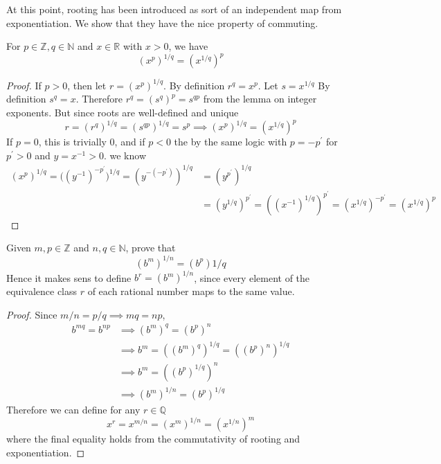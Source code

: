     At this point, rooting has been introduced as sort of an independent map from exponentiation. We show that they have the nice property of commuting. 

    \begin{lemma}
      For $p \in \mathbb{Z}, q \in \mathbb{N}$ and $x \in \mathbb{R}$ with $x > 0$, we have 
      \begin{equation}
        (x^{p})^{1/q} = (x^{1/q})^p
      \end{equation}
    \end{lemma}
    \begin{proof}
      If $p > 0$, then let $r = (x^p)^{1/q}$. By definition $r^q = x^p$. Let $s = x^{1/q}$ By definition $s^q = x$. Therefore $r^q = (s^q)^p = s^{qp}$ from the lemma on integer exponents. But since roots are well-defined and unique 
      \begin{equation}
        r = (r^q)^{1/q} = (s^{qp})^{1/q} = s^p \implies (x^p)^{1/q} = (x^{1/q})^p
      \end{equation}
      If $p = 0$, this is trivially $0$, and if $p < 0$ the by the same logic with $p = -p^\prime$ for $p^\prime > 0$ and $y = x^{-1} > 0$. we know 
      \begin{align}
        (x^p)^{1/q} = \big( (y^{-1})^{-p^\prime} \big)^{1/q} = (y^{-(-p^\prime)})^{1/q} & = (y^{p^\prime})^{1/q} \\ 
                           & = (y^{1/q})^{p^\prime} = ((x^{-1})^{1/q})^{p^\prime} = (x^{1/q})^{-p^\prime} = (x^{1/q})^p
      \end{align}
    \end{proof}

    \begin{theorem}
      Given $m, p \in \mathbb{Z}$ and $n, q \in \mathbb{N}$, prove that 
      \begin{equation}
        (b^m)^{1/n} = (b^p){1/q}
      \end{equation}
      Hence it makes sens to define $b^r = (b^m)^{1/n}$, since every element of the equivalence class $r$ of each rational number maps to the same value. 
    \end{theorem} 
    \begin{proof}
      Since $m/n = p/q \implies mq = np$, 
      \begin{align}
        b^{mq} = b^{np} & \implies (b^m)^q = (b^p)^n \\
                        & \implies b^m = ((b^m)^q)^{1/q} = ((b^p)^n)^{1/q} \\
                        & \implies b^m = ((b^p)^{1/q})^n \\
                        & \implies (b^m)^{1/n} = (b^p)^{1/q}
      \end{align}
      Therefore we can define for any $r \in \mathbb{Q}$ 
      \begin{equation}
        x^r = x^{m/n} = (x^{m})^{1/n} = (x^{1/n})^m
      \end{equation}
      where the final equality holds from the commutativity of rooting and exponentiation. 
    \end{proof}


